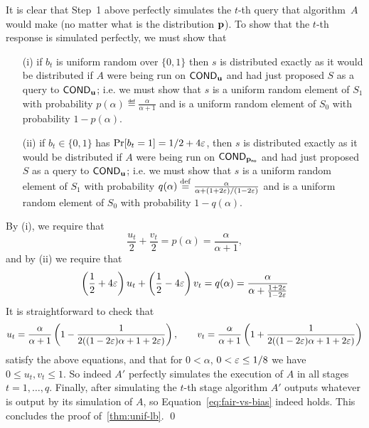 It is clear that Step~1 above perfectly simulates the $t$-th query that
algorithm~$A$ would make (no matter what is the distribution $\mathbf{p}$).  To
show that the $t$-th response is simulated perfectly, we must show that

\begin{itemize}

\item [(i)] if $b_t$ is uniform random over $\{0,1\}$ then
$s$ is distributed exactly as it would be distributed if $A$
were being run on ${\sf COND}_{\mathbf{u}}$ and had just proposed $S$ as a query to
${\sf COND}_{\mathbf{u}}$; i.e. we must show that $s$ is a uniform random element
of $S_1$ with probability $p(\alpha) \eqdef {\frac {\alpha}{\alpha + 1}}$
and is a uniform random element of $S_0$ with probability $1-p(\alpha).$

\item [(ii)] if $b_t \in \{0,1\}$ has $\Pr[b_t=1]=1/2 + 4 \varepsilon$,
then $s$ is distributed exactly as it would be distributed if $A$
were being run on ${\sf COND}_{\mathbf{p}_{\text {\textsf{no}}}}$
and had just proposed $S$ as a query to
${\sf COND}_{\mathbf{u}}$; i.e. we must show that $s$ is a uniform random element
of $S_1$ with probability $q(\alpha) \stackrel{\rm def}{=} {\frac {\alpha}{\alpha +
(1+2\varepsilon)/(1-2\varepsilon)}}$
and is a uniform random element of $S_0$ with probability $1-q(\alpha).$

\end{itemize}

By (i), we require that
\begin{equation} \label{eq:p}
{\frac {u_t} 2} + {\frac {v_t} 2} = p(\alpha) = {\frac \alpha {\alpha+1}},
\end{equation}
and by (ii) we require that
\begin{equation} \label{eq:q}
\left({\frac{1}2} + 4\varepsilon\right)u_t +
\left({\frac{1}2} - 4\varepsilon\right)v_t = q(\alpha) =
{\frac \alpha {\alpha + {\frac {1+2\varepsilon}{1-2\varepsilon}}}}
\end{equation}
It is straightforward to check that
\[
u_t = {\frac \alpha {\alpha+1}} \left( 1 - {\frac{1}{2((1-2\varepsilon)\alpha + 1 + 2 \varepsilon)}} \right),
\quad \quad
v_t = {\frac \alpha {\alpha+1}} \left(
1 + {\frac{1}{2((1-2\varepsilon)\alpha + 1 + 2 \varepsilon)}}
\right)
\]
satisfy the above equations, and that for $0 < \alpha$, $0
< \varepsilon \leq 1/8$ we have $0 \leq u_t,v_t \leq 1$.
So indeed $A'$ perfectly simulates the execution of $A$ in all
stages $t=1,\dots,q$. Finally, after simulating the $t$-th stage
algorithm $A'$ outputs whatever is output by its simulation of $A$,
so Equation~\eqref{eq:fair-vs-bias} indeed holds.
This concludes the proof of~\cref{thm:unif-lb}. \qed


